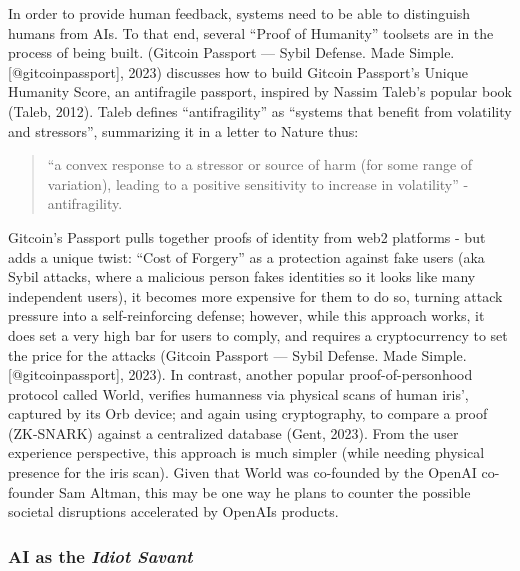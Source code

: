 \documentclass[
  12pt,
  letterpaper,
  DIV=11,
  numbers=noendperiod]{scrartcl}
\begin{document}
\let\pandoctableshortcapt\relax

In order to provide human feedback, systems need to be able to
distinguish humans from AIs. To that end, several ``Proof of Humanity''
toolsets are in the process of being built. (Gitcoin Passport --- Sybil
Defense. Made Simple. {[}@gitcoinpassport{]}, 2023) discusses how to
build Gitcoin Passport's Unique Humanity Score, an antifragile passport,
inspired by Nassim Taleb's popular book (Taleb, 2012). Taleb defines
``antifragility'' as ``systems that benefit from volatility and
stressors'', summarizing it in a letter to Nature thus:

\begin{quote}
``a convex response to a stressor or source of harm (for some range of
variation), leading to a positive sensitivity to increase in
volatility'' - antifragility.
\end{quote}

Gitcoin's Passport pulls together proofs of identity from web2 platforms
- but adds a unique twist: ``Cost of Forgery'' as a protection against
fake users (aka Sybil attacks, where a malicious person fakes identities
so it looks like many independent users), it becomes more expensive for
them to do so, turning attack pressure into a self-reinforcing defense;
however, while this approach works, it does set a very high bar for
users to comply, and requires a cryptocurrency to set the price for the
attacks (Gitcoin Passport --- Sybil Defense. Made Simple.
{[}@gitcoinpassport{]}, 2023). In contrast, another popular
proof-of-personhood protocol called World, verifies humanness via
physical scans of human iris', captured by its Orb device; and again
using cryptography, to compare a proof (ZK-SNARK) against a centralized
database (Gent, 2023). From the user experience perspective, this
approach is much simpler (while needing physical presence for the iris
scan). Given that World was co-founded by the OpenAI co-founder Sam
Altman, this may be one way he plans to counter the possible societal
disruptions accelerated by OpenAIs products.

\subsubsection{\texorpdfstring{AI as the \emph{Idiot
Savant}}{AI as the Idiot Savant}}\label{ai-as-the-idiot-savant}
\end{document}
